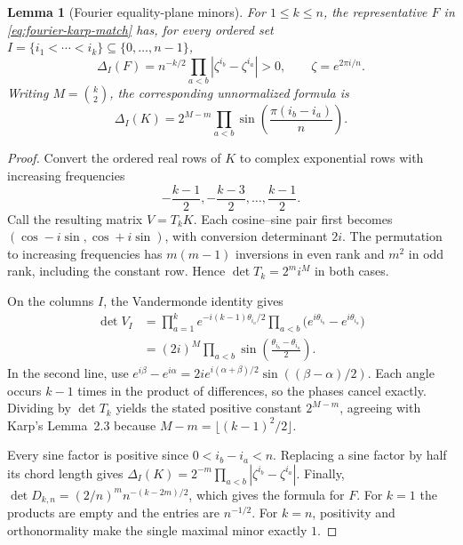 \documentclass[11pt]{article}
\newtheorem{lemma}[theorem]{Lemma}
\newcommand{\abs}[1]{\left|#1\right|}
\begin{document}
\begin{lemma}[Fourier equality-plane minors]
\label{lem:fourier-minors}
For \(1\leq k\leq n\), the representative \(F\) in
\eqref{eq:fourier-karp-match} has, for every ordered set
\(I=\{i_1<\cdots<i_k\}\subseteq\{0,\ldots,n-1\}\),
\[
  \Delta_I(F)=n^{-k/2}
    \prod_{a<b}\abs{\zeta^{i_b}-\zeta^{i_a}}>0,
  \qquad
  \zeta=e^{2\pi i/n}.
\]
Writing \(M=\binom{k}{2}\), the corresponding unnormalized formula is
\[
 \Delta_I(K)=2^{M-m}\prod_{a<b}
      \sin\!\left(\frac{\pi(i_b-i_a)}n\right).
\]
\end{lemma}

\begin{proof}
Convert the ordered real rows of \(K\) to complex exponential rows with
increasing frequencies
\[
 -\frac{k-1}{2},-\frac{k-3}{2},\ldots,\frac{k-1}{2}.
\]
Call the resulting matrix \(V=T_kK\). Each cosine--sine pair first becomes
\((\cos-i\sin,\cos+i\sin)\), with conversion determinant \(2i\).
The permutation to increasing frequencies has \(m(m-1)\) inversions in
even rank and \(m^2\) in odd rank, including the constant row. Hence
\(\det T_k=2^m i^M\) in both cases.

On the columns \(I\), the Vandermonde identity gives
\begin{align*}
 \det V_I
 &=\prod_{a=1}^k e^{-i(k-1)\theta_{i_a}/2}
      \prod_{a<b}\bigl(e^{i\theta_{i_b}}-e^{i\theta_{i_a}}\bigr)\\
 &=(2i)^M\prod_{a<b}
      \sin\!\left(\frac{\theta_{i_b}-\theta_{i_a}}2\right).
\end{align*}
In the second line, use
\(e^{i\beta}-e^{i\alpha}
 =2i e^{i(\alpha+\beta)/2}\sin((\beta-\alpha)/2)\).
Each angle occurs \(k-1\) times in the product of differences, so the
phases cancel exactly. Dividing by \(\det T_k\) yields the stated
positive constant \(2^{M-m}\), agreeing with Karp's Lemma~2.3 because
\(M-m=\lfloor(k-1)^2/2\rfloor\).

Every sine factor is positive since \(0<i_b-i_a<n\). Replacing a sine
factor by half its chord length gives
\(\Delta_I(K)=2^{-m}\prod_{a<b}|\zeta^{i_b}-\zeta^{i_a}|\).
Finally,
\(\det D_{k,n}=(2/n)^m n^{-(k-2m)/2}\), which gives the formula for
\(F\). For \(k=1\) the products are empty and the entries are
\(n^{-1/2}\). For \(k=n\), positivity and orthonormality make the single
maximal minor exactly \(1\).
\end{proof}
\end{document}
